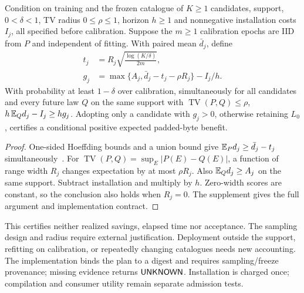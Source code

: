 \begin{theorem}\label{thm:adoption}
Condition on training and the frozen catalogue of $K\ge1$ candidates,
support, $0<\delta<1$, TV radius $0\le\rho\le1$, horizon $h\ge1$ and
nonnegative installation costs $I_j$, all specified before calibration.
Suppose the $m\ge1$ calibration epochs are IID from $P$ and independent
of fitting. With paired mean $\bar d_j$, define
\begin{align}
t_j&=R_j\sqrt{\frac{\log(K/\delta)}{2m}},\nonumber\\
g_j&=\max\{A_j,\bar d_j-t_j-\rho R_j\}-I_j/h.
\label{eq:adoption-lower}
\end{align}
With probability at least $1-\delta$ over calibration, simultaneously
for all candidates and every future law $Q$ on the same support with
$\operatorname{TV}(P,Q)\le\rho$, $h\,\mathbb E_Qd_j-I_j\ge h g_j$.
Adopting only a candidate with $g_j>0$, otherwise retaining $L_0$,
certifies a conditional positive expected padded-byte benefit.
\end{theorem}
\begin{proof}
One-sided Hoeffding bounds and a union bound give
$\mathbb E_Pd_j\ge\bar d_j-t_j$ simultaneously~\cite{hoeffding,learntest}.
For $\operatorname{TV}(P,Q)=\sup_E|P(E)-Q(E)|$,
a function of range width $R_j$ changes expectation by at most
$\rho R_j$. Also $\mathbb E_Qd_j\ge A_j$ on the same support.
Subtract installation and multiply by $h$. Zero-width scores are
constant, so the conclusion also holds when $R_j=0$.
The supplement gives the full argument and implementation contract.
\end{proof}
This certifies neither realized savings, elapsed time nor acceptance.
The sampling design and radius require external justification. Deployment
outside the support, refitting on calibration, or repeatedly changing
catalogues needs new accounting. The implementation binds the plan to a
digest and requires sampling/freeze provenance; missing evidence returns
$\mathsf{UNKNOWN}$. Installation is charged once; compilation and consumer
utility remain separate admission tests.
